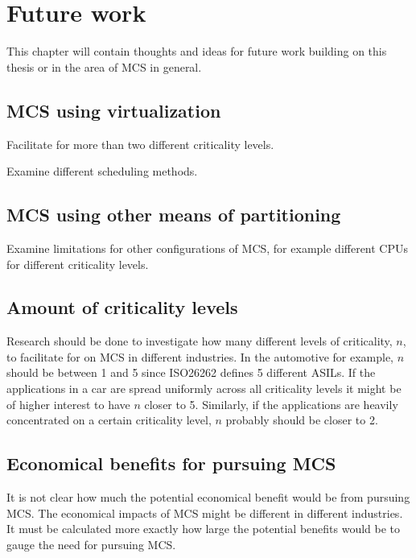 \chapter{Future work}
This chapter will contain thoughts and ideas for future work building on this thesis or in the area of MCS in general.

\section{MCS using virtualization}
Facilitate for more than two different criticality levels.

Examine different scheduling methods. %

\section{MCS using other means of partitioning}
Examine limitations for other configurations of MCS, for example different CPUs for different criticality levels.

\section{Amount of criticality levels}
Research should be done to investigate how many different levels of criticality, $n$, to facilitate for on MCS in different industries. In the automotive for example, $n$ should be between 1 and 5 since ISO26262 defines 5 different ASILs. If the applications in a car are spread uniformly across all criticality levels it might be of higher interest to have $n$ closer to 5. Similarly, if the applications are heavily concentrated on a certain criticality level, $n$ probably should be closer to 2.

\section{Economical benefits for pursuing MCS}
It is not clear how much the potential economical benefit would be from pursuing MCS. The economical impacts of MCS might be different in different industries. It must be calculated more exactly how large the potential benefits would be to gauge the need for pursuing MCS.